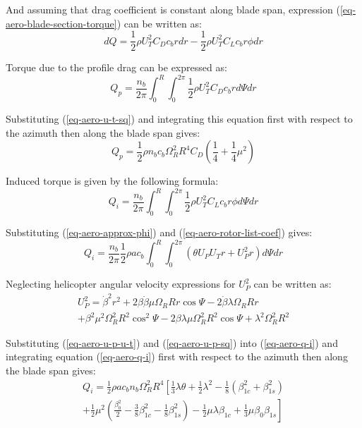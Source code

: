 And assuming that drag coefficient is constant along blade span, expression (\ref{eq-aero-blade-section-torque}) can be written as: \cite{GessowMyers1985, Bramwell2001}
\begin{equation}
  dQ =
  \frac{1}{2} \rho U_T^2 C_D c_b r dr -
  \frac{1}{2} \rho U_T^2 C_L c_b r \phi dr
\end{equation}

Torque due to the profile drag can be expressed as: \cite{Bramwell2001}
\begin{equation}
  Q_p = \frac{n_b}{2\pi}
  \int_{0}^{R} \int_{0}^{2\pi} \frac{1}{2} \rho U_T^2 C_D c_b r d \Psi dr
\end{equation}

Substituting (\ref{eq-aero-u-t-sq}) and integrating this equation first with respect to the azimuth then along the blade span gives:
\begin{equation}
  Q_p = \frac{1}{2} \rho n_b c_b \Omega_R^2 R^4 C_D
  \left( \frac{1}{4} + \frac{1}{4} \mu^2 \right)
\end{equation}

Induced torque is given by the following formula: \cite{Bramwell2001}
\begin{equation}
  Q_i = \frac{n_b}{2\pi} \int_{0}^{R} \int_{0}^{2\pi}
  \frac{1}{2} \rho U_T^2 C_L c_b r \phi d \Psi dr
\end{equation}

Substituting (\ref{eq-aero-approx-phi}) and (\ref{eq-aero-rotor-list-coef}) gives:
\begin{equation}
  \label{eq-aero-q-i}
  Q_i = \frac{n_b}{2\pi} \frac{1}{2} \rho a c_b
  \int_{0}^{R} \int_{0}^{2\pi}
  \left( \theta U_P U_T r + U_P^2 r \right) d \Psi dr
\end{equation}

Neglecting helicopter angular velocity expressions for $U_P^2$ can be written as:
\begin{multline}
  \label{eq-aero-u-p-sq}
  U_P^2 = \dot \beta^2 r^2
  + 2 \beta \dot \beta \mu \Omega_R R r \cos \Psi
  - 2 \dot \beta \lambda \Omega_R R r \\
  + \beta^2 \mu^2 \Omega_R^2 R^2 \cos^2 \Psi
  - 2 \beta \lambda \mu \Omega_R^2 R^2 \cos \Psi
  + \lambda^2 \Omega_R^2 R^2
\end{multline}

Substituting (\ref{eq-aero-u-p-u-t}) and (\ref{eq-aero-u-p-sq}) into (\ref{eq-aero-q-i}) and integrating equation (\ref{eq-aero-q-i}) first with respect to the azimuth then along the blade span gives:
\begin{multline}
Q_i = \frac{1}{2} \rho a c_b n_b \Omega_R^2 R^4
\left[
    \frac{1}{3} \lambda \theta
  + \frac{1}{2} \lambda^2
  - \frac{1}{8} \left( \beta_{1c}^2 + \beta_{1s}^2 \right)
  \right.
  \\
  \left.
  + \frac{1}{2} \mu^2
  \left(
    \frac{\beta_0^2}{2}
    - \frac{3}{8} \beta_{1c}^2
    - \frac{1}{8} \beta_{1s}^2
  \right)
  - \frac{1}{2} \mu \lambda \beta_{1c}
  + \frac{1}{3} \mu \beta_0 \beta_{1s}
\right]
\end{multline}

